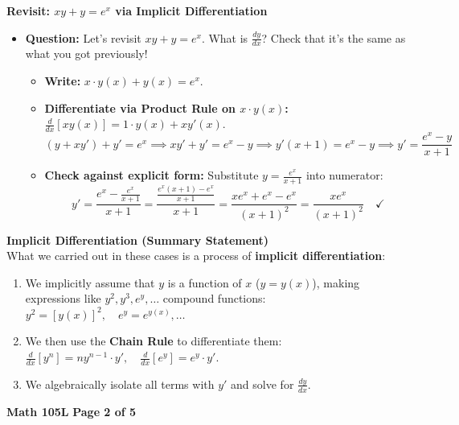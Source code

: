 \documentclass[10.5pt]{article}
\begin{document}
\vspace{0.04in}
\textbf{\large Revisit: $xy + y = e^x$ via Implicit Differentiation}
\begin{itemize}[leftmargin=1.2em, topsep=0pt, itemsep=1pt]
  \item \textbf{Question:} Let's revisit $xy + y = e^x$. What is $\frac{dy}{dx}$? Check that it's the same as what you got previously!
  \begin{itemize}[leftmargin=1.2em, label=$\bullet$, topsep=0pt, itemsep=1pt]
    \item \textbf{Write:} $x \cdot y(x) + y(x) = e^x$.
    \item \textbf{Differentiate via Product Rule on $x \cdot y(x)$:} $\frac{d}{dx}[x y(x)] = 1 \cdot y(x) + x y'(x)$.
    \[
      (y + x y') + y' = e^x \implies x y' + y' = e^x - y \implies y'(x+1) = e^x - y \implies y' = \frac{e^x - y}{x+1}
    \]
    \item \textbf{Check against explicit form:} Substitute $y = \frac{e^x}{x+1}$ into numerator:
    \[
      y' = \frac{e^x - \frac{e^x}{x+1}}{x+1} = \frac{\frac{e^x(x+1) - e^x}{x+1}}{x+1} = \frac{xe^x + e^x - e^x}{(x+1)^2} = \frac{xe^x}{(x+1)^2} \quad \checkmark
    \]
  \end{itemize}
\end{itemize}

\vspace{0.04in}
\begin{tcolorbox}[colback=boxbg, colframe=boxframe, boxrule=0.7pt, arc=2.5pt, left=6pt, right=6pt, top=4pt, bottom=4pt]
  \textbf{\large Implicit Differentiation (Summary Statement)}\\[2pt]
  What we carried out in these cases is a process of \textbf{implicit differentiation}:
  \begin{enumerate}[leftmargin=1.2em, topsep=1pt, itemsep=1pt]
    \item We implicitly assume that $y$ is a function of $x$ ($y = y(x)$), making expressions like $y^2, y^3, e^y, \dots$ compound functions: $y^2 = [y(x)]^2, \quad e^y = e^{y(x)}, \dots$
    \item We then use the \textbf{Chain Rule} to differentiate them: $\frac{d}{dx}[y^n] = n y^{n-1} \cdot y', \quad \frac{d}{dx}[e^y] = e^y \cdot y'$.
    \item We algebraically isolate all terms with $y'$ and solve for $\frac{dy}{dx}$.
  \end{enumerate}
\end{tcolorbox}

\vfill
\noindent \textbf{Math 105L} \hfill \textbf{Page 2 of 5}
\end{document}
